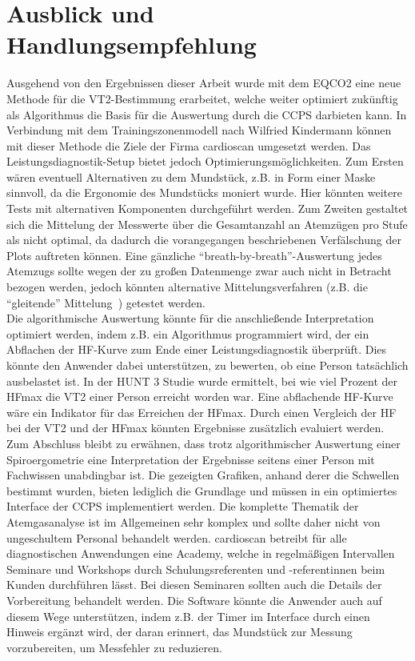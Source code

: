 \section{Ausblick und Handlungsempfehlung}
%
Ausgehend von den Ergebnissen dieser Arbeit wurde mit dem \acs{EQCO2} eine neue Methode für die VT2-Bestimmung erarbeitet, welche weiter optimiert zukünftig als Algorithmus die Basis für die Auswertung durch die \acs{CCPS} darbieten kann. In Verbindung mit dem Trainingszonenmodell nach Wilfried Kindermann können mit dieser Methode die Ziele der Firma cardioscan umgesetzt werden. Das Leistungsdiagnostik-Setup bietet jedoch Optimierungsmöglichkeiten. Zum Ersten wären eventuell Alternativen zu dem Mundstück, z.B. in Form einer Maske sinnvoll, da die Ergonomie des Mundstücks moniert wurde. Hier könnten weitere Tests mit alternativen Komponenten durchgeführt werden. Zum Zweiten gestaltet sich die Mittelung der Messwerte über die Gesamtanzahl an Atemzügen pro Stufe als nicht optimal, da dadurch die vorangegangen beschriebenen Verfälschung der Plots auftreten können. Eine gänzliche "`breath-by-breath"'-Auswertung jedes Atemzugs sollte wegen der zu großen Datenmenge zwar auch nicht in Betracht bezogen werden, jedoch könnten alternative Mittelungsverfahren (z.B. die "`gleitende"' Mittelung~\cite{Kroidl.2015}) getestet werden.\\
Die algorithmische Auswertung könnte für die anschließende Interpretation optimiert werden, indem z.B. ein Algorithmus programmiert wird, der ein Abflachen der \acs{HF}-Kurve zum Ende einer Leistungsdiagnostik überprüft. Dies könnte den Anwender dabei unterstützen, zu bewerten, ob eine Person tatsächlich ausbelastet ist. In der HUNT 3 Studie wurde ermittelt, bei wie viel Prozent der \acs{HFmax} die VT2 einer Person erreicht worden war. Eine abflachende \acs{HF}-Kurve wäre ein Indikator für das Erreichen der \acs{HFmax}. Durch einen Vergleich der \acs{HF} bei der VT2 und der \acs{HFmax} könnten Ergebnisse zusätzlich evaluiert werden.\\
Zum Abschluss bleibt zu erwähnen, dass trotz algorithmischer Auswertung einer Spiroergometrie eine Interpretation der Ergebnisse seitens einer Person mit Fachwissen unabdingbar ist. Die gezeigten Grafiken, anhand derer die Schwellen bestimmt wurden, bieten lediglich die Grundlage und müssen in ein optimiertes Interface der \acs{CCPS} implementiert werden. Die komplette Thematik der Atemgasanalyse ist im Allgemeinen sehr komplex und sollte daher nicht von ungeschultem Personal behandelt werden. cardioscan betreibt für alle diagnostischen Anwendungen eine Academy, welche in regelmäßigen Intervallen Seminare und Workshops durch Schulungsreferenten und -referentinnen beim Kunden durchführen lässt. Bei diesen Seminaren sollten auch die Details der Vorbereitung behandelt werden. Die Software könnte die Anwender auch auf diesem Wege unterstützen, indem z.B. der Timer im Interface durch einen Hinweis ergänzt wird, der daran erinnert, das Mundstück zur Messung vorzubereiten, um Messfehler zu reduzieren.
%
\nocite{*}


%
\printbibliography

